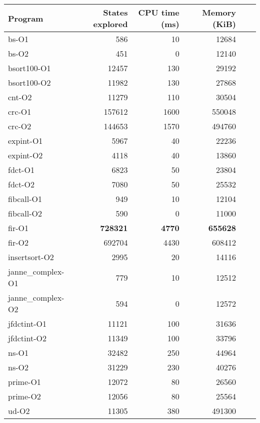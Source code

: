\begin{tabular}{|l||r|r|r|r|r|}
                                                                                       \hline
    Program           & States explored  & CPU time (ms) & Memory (KiB) \tabularnewline\hline
                                                                                       \hline
    bs-O1             & 586              & 10            & 12684        \tabularnewline\hline
    bs-O2             & 451              & 0             & 12140        \tabularnewline\hline
    bsort100-O1       & 12457            & 130           & 29192        \tabularnewline\hline
    bsort100-O2       & 11982            & 130           & 27868        \tabularnewline\hline
    cnt-O2            & 11279            & 110           & 30504        \tabularnewline\hline
    crc-O1            & 157612           & 1600          & 550048       \tabularnewline\hline
    crc-O2            & 144653           & 1570          & 494760       \tabularnewline\hline
    expint-O1         & 5967             & 40            & 22236        \tabularnewline\hline
    expint-O2         & 4118             & 40            & 13860        \tabularnewline\hline
    fdct-O1           & 6823             & 50            & 23804        \tabularnewline\hline
    fdct-O2           & 7080             & 50            & 25532        \tabularnewline\hline
    fibcall-O1        & 949              & 10            & 12104        \tabularnewline\hline
    fibcall-O2        & 590              & 0             & 11000        \tabularnewline\hline
    fir-O1            & \bf 728321       & \bf 4770      & \bf 655628   \tabularnewline\hline
    fir-O2            & 692704           & 4430          & 608412       \tabularnewline\hline
    insertsort-O2     & 2995             & 20            & 14116        \tabularnewline\hline
    janne\_complex-O1 & 779              & 10            & 12512        \tabularnewline\hline
    janne\_complex-O2 & 594              & 0             & 12572        \tabularnewline\hline
    jfdctint-O1       & 11121            & 100           & 31636        \tabularnewline\hline
    jfdctint-O2       & 11349            & 100           & 33796        \tabularnewline\hline
    ns-O1             & 32482            & 250           & 44964        \tabularnewline\hline
    ns-O2             & 31229            & 230           & 40276        \tabularnewline\hline
    prime-O1          & 12072            & 80            & 26560        \tabularnewline\hline
    prime-O2          & 12056            & 80            & 25564        \tabularnewline\hline
    ud-O2             & 11305            & 380           & 491300       \tabularnewline\hline
\end{tabular}
